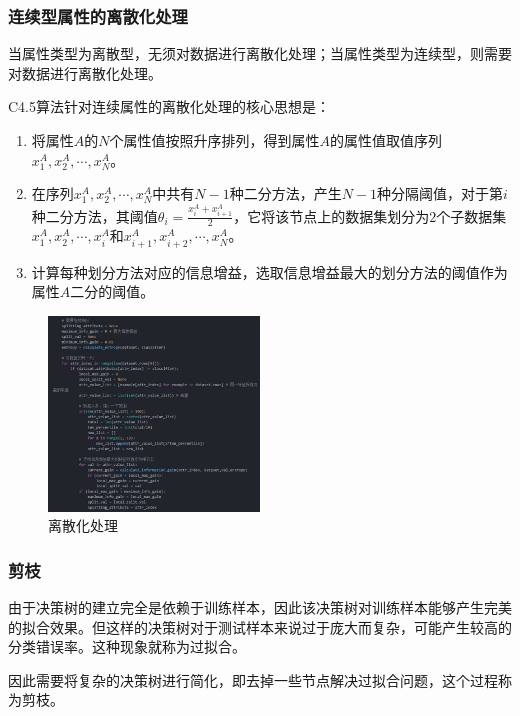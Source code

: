 \documentclass{sdureport}
\begin{document}
\begin{sduDocument}
	\subsubsection{连续型属性的离散化处理}

	当属性类型为离散型，无须对数据进行离散化处理；当属性类型为连续型，则需要对数据进行离散化处理。

	C4.5算法针对连续属性的离散化处理的核心思想是：
	\begin{enumerate}
		\item 将属性$A$的$N$个属性值按照升序排列，得到属性$A$的属性值取值序列$x_1^A,x_2^A,\cdots,x_N^A$。
		\item 在序列$x_1^A,x_2^A,\cdots,x_N^A$中共有$N-1$种二分方法，产生$N-1$种分隔阈值，对于第$i$种二分方法，其阈值$\theta_i=\frac{x_i^A+x_{i+1}^A}{2}$，它将该节点上的数据集划分为$2$个子数据集$x_1^A,x_2^A,\cdots,x_i^A$和$x_{i+1}^A,x_{i+2}^A,\cdots,x_N^A$。
		\item 计算每种划分方法对应的信息增益，选取信息增益最大的划分方法的阈值作为属性$A$二分的阈值。
	\end{enumerate}

	\begin{figure}[H]
		\begin{center}
		\includegraphics[width=0.5\textwidth]{image/5.7.3.jpg}
		\end{center}
		\caption{离散化处理}
	\end{figure}
	
	\subsubsection{剪枝}

	由于决策树的建立完全是依赖于训练样本，因此该决策树对训练样本能够产生完美的拟合效果。但这样的决策树对于测试样本来说过于庞大而复杂，可能产生较高的分类错误率。这种现象就称为过拟合。
	
	因此需要将复杂的决策树进行简化，即去掉一些节点解决过拟合问题，这个过程称为剪枝。


\end{sduDocument}
\end{document}
